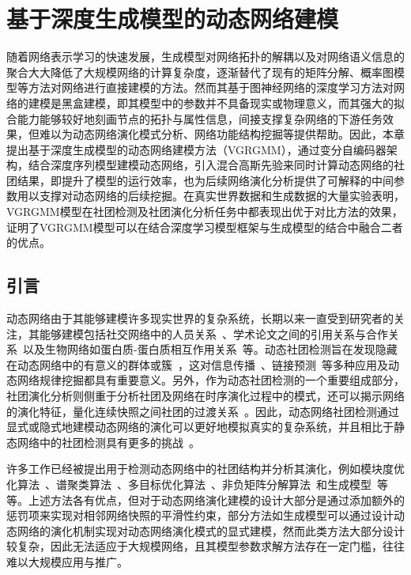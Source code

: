 \baselineskip 20pt


\chapter{基于深度生成模型的动态网络建模}
\label{chap:6}

随着网络表示学习的快速发展，生成模型对网络拓扑的解耦以及对网络语义信息的聚合大大降低了大规模网络的计算复杂度，逐渐替代了现有的矩阵分解、概率图模型等方法对网络进行直接建模的方法。然而其基于图神经网络的深度学习方法对网络的建模是黑盒建模，即其模型中的参数并不具备现实或物理意义，而其强大的拟合能力能够较好地刻画节点的拓扑与属性信息，间接支撑复杂网络的下游任务效果，但难以为动态网络演化模式分析、网络功能结构挖掘等提供帮助。因此，本章提出基于深度生成模型的动态网络建模方法（VGRGMM），通过变分自编码器架构，结合深度序列模型建模动态网络，引入混合高斯先验来同时计算动态网络的社团结果，即提升了模型的运行效率，也为后续网络演化分析提供了可解释的中间参数用以支撑对动态网络的后续挖掘。在真实世界数据和生成数据的大量实验表明，VGRGMM模型在社团检测及社团演化分析任务中都表现出优于对比方法的效果，证明了VGRGMM模型可以在结合深度学习模型框架与生成模型的结合中融合二者的优点。



\section{引言\label{chap6:intro}}


动态网络由于其能够建模许多现实世界的复杂系统，长期以来一直受到研究者的关注，其能够建模包括社交网络中的人员关系~\cite{newman2004finding}、学术论文之间的引用关系与合作关系~\cite{gopalan2013efficient,chikhaoui2015new}以及生物网络如蛋白质-蛋白质相互作用关系~\cite{palla2005uncovering,zhang2019relational}等。动态社团检测旨在发现隐藏在动态网络中的有意义的群体或簇~\cite{7384503,rossetti2018community}，这对信息传播~\cite{del2016spreading}、链接预测~\cite{lu2015toward,yu2017link,Ma.2019.Ming}等多种应用及动态网络规律\cite{laurienti2009modularity}挖掘都具有重要意义。另外，作为动态社团检测的一个重要组成部分，社团演化分析则侧重于分析社团及网络在时序演化过程中的模式，还可以揭示网络的演化特征，量化连续快照之间社团的过渡关系~\cite{tang2014detecting}。因此，动态网络社团检测通过显式或隐式地建模动态网络的演化可以更好地模拟真实的复杂系统，并且相比于静态网络中的社团检测具有更多的挑战~\cite{rossetti2018community}。


许多工作已经被提出用于检测动态网络中的社团结构并分析其演化，例如模块度优化算法~\cite{Mucha.2010.Onnela}、谱聚类算法~\cite{liu2018global}、多目标优化算法~\cite{Zhang.2017.Niu,Zhang.2020.Jin}、非负矩阵分解算法~\cite{Ma.2017.Dong}和生成模型~\cite{pensky2019spectral}等等。上述方法各有优点，但对于动态网络演化建模的设计大部分是通过添加额外的惩罚项来实现对相邻网络快照的平滑性约束，部分方法如生成模型可以通过设计动态网络的演化机制实现对动态网络演化模式的显式建模，然而此类方法大部分设计较复杂，因此无法适应于大规模网络，且其模型参数求解方法存在一定门槛，往往难以大规模应用与推广。


